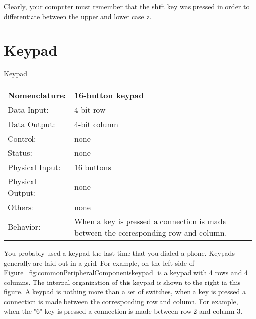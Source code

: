             Clearly, your computer must remember that the shift key was pressed
            in order to differentiate between the upper and lower case z.

            \section{Keypad}
                \label{page:keypad}
                \begin{buildingblock}{Keypad}
                    \begin{tabular}{|l|p{3.5in}|} \hline
                        Nomenclature:  & 16-button keypad                           \\ \hline
                        Data Input:    & 4-bit row        \\ \hline
                        Data Output:   & 4-bit column   \\ \hline
                        Control:       & none           \\ \hline
                        Status:        & none                                   \\ \hline
                        Physical Input:& 16 buttons        \\ \hline
                        Physical Output:& none        \\ \hline
                        Others:        & none                   \\ \hline
                        Behavior:      & When a key is pressed a connection is made between
                        the corresponding row and column. \\ \hline
                    \end{tabular}
                \end{buildingblock}

                You probably used a keypad the last time that you dialed a phone.
                Keypads generally are laid out in a grid.
                For example, on the left side of Figure~\ref{fig:commonPeripheralComponentskeypad}
                is a keypad with 4 rows and 4 columns.  The internal organization
                of this keypad is shown to the right in this figure.  A keypad is
                nothing more than a set of switches, when a key is pressed a connection
                is made between the corresponding row and column.  For example, when
                the "6" key is pressed a connection is made between row 2 and column
                3.

